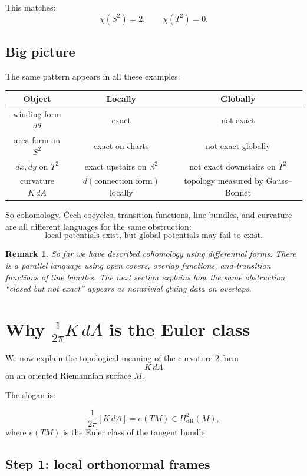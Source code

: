 \documentclass[11pt]{article}
\newtheorem{remark}{Remark}
\begin{document}
	This matches:
	\[
	\chi(S^2)=2,\qquad \chi(T^2)=0.
	\]
	
	\subsection*{Big picture}
	
	The same pattern appears in all these examples:
	
	\begin{center}
		\begin{tabular}{c|c|c}
			Object & Locally & Globally \\
			\hline
			winding form \(d\theta\) & exact & not exact \\
			area form on \(S^2\) & exact on charts & not exact globally \\
			\(dx,dy\) on \(T^2\) & exact upstairs on \(\mathbb{R}^2\) & not exact downstairs on \(T^2\) \\
			curvature \(K\,dA\) & \(d(\text{connection form})\) locally & topology measured by Gauss--Bonnet
		\end{tabular}
	\end{center}
	
	So cohomology, \v{C}ech cocycles, transition functions, line bundles, and curvature are all different languages for the same obstruction:
	\[
	\boxed{
		\text{local potentials exist, but global potentials may fail to exist.}
	}
	\]
	\begin{remark}
		So far we have described cohomology using differential forms. There is a parallel language using open covers, overlap functions, and transition functions of line bundles. The next section explains how the same obstruction ``closed but not exact'' appears as nontrivial gluing data on overlaps.
	\end{remark}
	
	\newpage
	\section{Why \(\frac{1}{2\pi}K\,dA\) is the Euler class}
	
	We now explain the topological meaning of the curvature \(2\)-form
	\[
	K\,dA
	\]
	on an oriented Riemannian surface \(M\).
	
	The slogan is:
	
	\[
	\boxed{
		\frac{1}{2\pi}[K\,dA] = e(TM)\in H^2_{\mathrm{dR}}(M),
	}
	\]
	where \(e(TM)\) is the Euler class of the tangent bundle.
	
	\subsection*{Step 1: local orthonormal frames}
	
\end{document}
